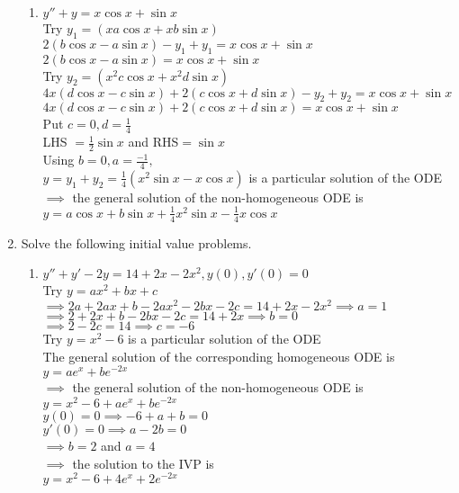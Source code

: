 \documentclass[a4paper]{article}
\begin{document}
\begin{enumerate}
\begin{enumerate}
		\item $y''+y=x\cos x + \sin x$\\
		Try $y_1=(xa\cos x +xb\sin x)$\\
		$2(b\cos x- a \sin x) - y_1 +y_1=x\cos x + \sin x$\\
		$2(b\cos x- a \sin x) =x\cos x + \sin x$\\
		Try $y_2=(x^2c\cos x +x^2d\sin x)$\\
		$4x(d\cos x- c \sin x) + 2(c\cos x+ d \sin x) - y_2 +y_2=x\cos x + \sin x$\\
		$4x(d\cos x- c \sin x) + 2(c\cos x+ d \sin x)=x\cos x + \sin x$\\
		Put $c=0, d=\frac{1}{4}$\\
		LHS $= \frac{1}{2} \sin x$ and RHS$ = \sin x$\\
		Using $b=0, a=\frac{-1}{4},$\\$ y=y_1+y_2=\frac{1}{4}(x^2\sin x-x\cos x) $ is a particular solution of the ODE\\
		$\implies$ the general solution of the non-homogeneous ODE is \\
		$y=a\cos x +b\sin x + \frac{1}{4}x^2\sin x-\frac{1}{4}x\cos x$
	\end{enumerate}
	
	\item Solve the following initial value problems.
	\begin{enumerate}
		\item $y''+y'-2y=14+2x-2x^2, y(0),y'(0)=0$\\
		Try $y=ax^2 + bx +c$\\
		$\implies 2a + 2ax+b-2ax^2-2bx-2c=14+2x-2x^2 \implies a=1$\\
		$\implies 2 + 2x+b-2bx-2c=14+2x \implies b=0$\\		
		$\implies 2 -2c=14 \implies c=-6$\\
		Try $y=x^2 -6$ is a particular solution of the ODE\\
		The general solution of the corresponding homogeneous ODE is $y=ae^x+be^{-2x}$\\
		$\implies$ the general solution of the non-homogeneous ODE is \\
		$y=x^2 -6+ae^x+be^{-2x}$\\
		$y(0)=0 \implies -6+a+b=0$\\
		$y'(0)=0 \implies a-2b=0$\\
		$\implies b=2$ and $a=4$\\
		$\implies$ the solution to the IVP is \\
		$y=x^2 -6+4e^x+2e^{-2x}$
		

\end{enumerate}
\end{enumerate}
\end{document}
